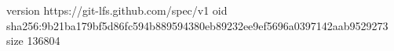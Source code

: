 version https://git-lfs.github.com/spec/v1
oid sha256:9b21ba179bf5d86fc594b889594380eb89232ee9ef5696a0397142aab9529273
size 136804
